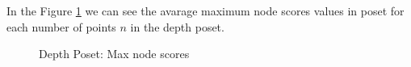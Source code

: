 \documentclass{article}
\begin{document}
\par In the Figure \ref{fig:scores_node_max} we can see the avarage maximum node scores values in poset for each number of points $n$ in the depth poset.
\begin{figure}[ht]
  \vspace{-96pt}
  \centering
  \hspace*{-0.18999999999999995\textwidth}
  \caption{Depth Poset: Max node scores}
  \label{fig:scores_node_max}
\end{figure}
\end{document}
